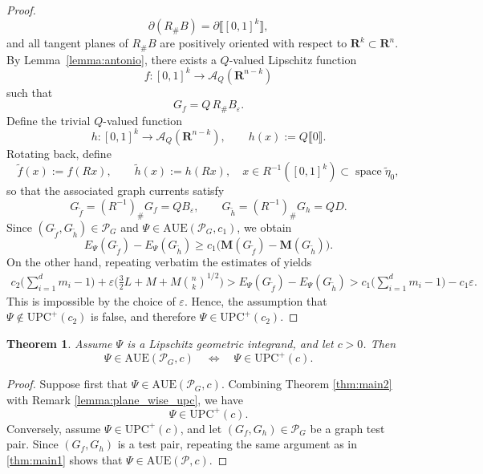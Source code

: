 \documentclass[a4paper,twoside,reqno]{article}
\theoremstyle{definition}
\theoremstyle{remark}
\theoremstyle{plain}
\newtheorem{theorem}{Theorem}[section]
\theoremstyle{remark}
\theoremstyle{definition}
\newcommand{\Mass}{\mathbf{M}}
\newcommand{\UPC}{\mathrm{UPC}}
\newcommand{\AUE}{\mathrm{AUE}}
\newcommand{\R}{\mathbf{R}}
\DeclareMathOperator{\asssp}{space}
\newcommand{\qspace}[1]{\mathcal{A}_{{#1}}}
\begin{document}
\begin{proof}
    \[
        \partial (R_{\#} B) = \partial \llbracket [0,1]^k \rrbracket,
    \]
    and all tangent planes of $R_{\#} B$ are positively oriented with respect to
    $\R^k \subset \R^n$.
    By Lemma~\ref{lemma:antonio}, there exists a $Q$-valued Lipschitz function
    \[
        f : [0,1]^k \to \qspace{Q}(\R^{n-k})
    \]
    such that
    \[
        G_f = Q\, R_{\#} B_\varepsilon.
    \]
    Define the trivial $Q$-valued function
    \[
        h : [0,1]^k \to \qspace{Q}(\R^{n-k}),
        \qquad h(x) := Q \llbracket 0 \rrbracket.
    \]
    Rotating back, define
    \[
        \tilde{f}(x) := f(Rx), \qquad
        \tilde{h}(x) := h(Rx),
        \quad x \in R^{-1}([0,1]^k) \subset \asssp \tilde{\eta}_0,
    \]
    so that the associated graph currents satisfy
    \[
        G_{\tilde{f}} = (R^{-1})_{\#} G_f = Q B_\varepsilon,
        \qquad
        G_{\tilde{h}} = (R^{-1})_{\#} G_h = Q D.
    \]
    Since $(G_{\tilde{f}}, G_{\tilde{h}}) \in \mathcal{P}_G$ and
    $\Psi \in \AUE(\mathcal{P}_G, c_1)$, we obtain
    \[
        E_{\Psi}(G_{\tilde{f}}) - E_{\Psi}(G_{\tilde{h}})
        \ge c_1 \bigl( \Mass(G_{\tilde{f}}) - \Mass(G_{\tilde{h}}) \bigr).
    \]
    On the other hand, repeating verbatim the estimates of
    \cite[5.10]{Lesniak_2025} yields
    \begin{multline}
        c_{2}\bigl( \sum_{i=1}^d m_i - 1 \bigr)
        + \varepsilon \bigl( \tfrac32 L + M + M \binom{n}{k}^{1/2} \bigr)
        > E_{\Psi}(G_{\tilde{f}}) - E_{\Psi}(G_{\tilde{h}})
        > c_{1}\bigl( \sum_{i=1}^d m_i - 1 \bigr) - c_{1}\varepsilon.
    \end{multline}
    This is impossible by the choice of $\varepsilon$. Hence, the assumption that
    $\Psi \notin \UPC^{+}(c_2)$ is false, and therefore
    $\Psi \in \UPC^{+}(c_2)$.
\end{proof}

\begin{theorem}\label{corollary:thm2}
    Assume $\Psi$ is a Lipschitz geometric integrand, and let $c > 0$. Then
    \[
        \Psi \in \AUE(\mathcal{P}_G, c)
        \quad \Longleftrightarrow \quad
        \Psi \in \UPC^{+}(c).
    \]
\end{theorem}

\begin{proof}
    Suppose first that $\Psi \in \AUE(\mathcal{P}_G, c)$.
    Combining Theorem \ref{thm:main2} with Remark \ref{lemma:plane_wise_upc}, 
    we have
    \[
        \Psi \in \UPC^{+}(c).
    \]
    Conversely, assume $\Psi \in \UPC^{+}(c)$, and let 
    $(G_f, G_h) \in \mathcal{P}_G$ be a graph test pair. Since $(G_f, G_h)$ is 
    a test pair, repeating the same argument as in \ref{thm:main1} shows that 
    $\Psi \in \AUE(\mathcal{P}, c)$.
\end{proof}
\end{document}
